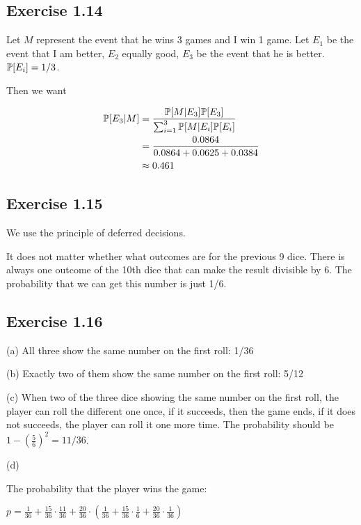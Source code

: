 \subsection*{Exercise 1.14}

Let $M$ represent the event that he wins 3 games and I win 1 game. Let $E_1$ be the event that I am better,
$E_2$ equally good, $E_3$ be the event that he is better. $\P[E_i] = 1/3$.

Then we want 

\begin{equation*}
\begin{split}
\P[E_3 | M] & = \frac{\P[M | E_3] \P[E_3]}{\sum_{i=1}^{3} \P[M | E_i] \P[E_i]} \\
& = \frac{0.0864}{0.0864 + 0.0625 + 0.0384} \\
& \approx 0.461
\end{split}
\end{equation*}

\subsection*{Exercise 1.15}

We use the principle of deferred decisions. 

It does not matter whether what outcomes are for the previous 9 dice. There is always one outcome of the 10th dice
that can make the result divisible by 6. The probability that we can get this number is just 1/6.

\subsection*{Exercise 1.16}

\noindent (a) All three show the same number on the first roll: 1/36

\noindent (b) Exactly two of them show the same number on the first roll: 5/12

\noindent (c) When two of the three dice showing the same number on the first roll, the player can roll the different one
once, if it succeeds, then the game ends, if it does not succeeds, the player can roll it one more time. The probability
should be $1 - (\frac{5}{6})^2 = 11/36$.

\noindent (d)

The probability that the player wins the game:

$p = \frac{1}{36} + \frac{15}{36} \cdot \frac{11}{36} + \frac{20}{36} 
\cdot (\frac{1}{36} + \frac{15}{36} \cdot \frac{1}{6} + \frac{20}{36} \cdot \frac{1}{36}) $



